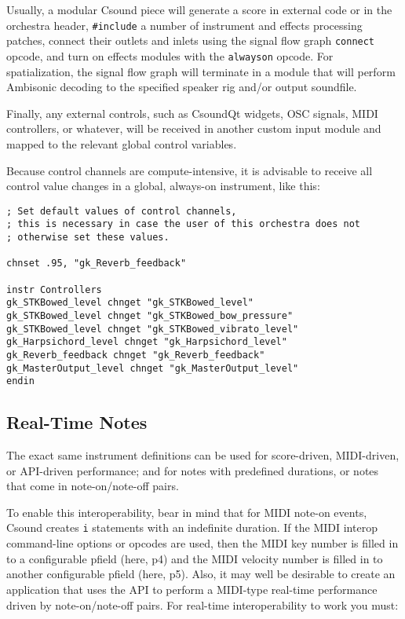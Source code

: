 \documentclass[12pt,letterpaper,onecolumn]{scrartcl}
\begin{document}
\begin{enumerate}
Usually, a modular Csound piece will generate a score in external code or in
the orchestra header, \texttt{\#include} a number of instrument and effects
processing patches, connect their outlets and inlets using the signal flow
graph \texttt{connect} opcode, and turn on effects modules with the
\texttt{alwayson} opcode. For spatialization, the signal flow graph will
terminate in a module that will perform Ambisonic decoding to the specified
speaker rig and/or output soundfile.

Finally, any external controls, such as CsoundQt widgets, OSC signals, MIDI
controllers, or whatever, will be received in another custom input module and
mapped to the relevant global control variables.

Because control channels are compute-intensive, it is advisable to receive all
control value changes in a global, always-on instrument, like this:

\begin{lstlisting}
; Set default values of control channels,
; this is necessary in case the user of this orchestra does not
; otherwise set these values.

chnset .95, "gk_Reverb_feedback"

instr Controllers
gk_STKBowed_level chnget "gk_STKBowed_level"
gk_STKBowed_level chnget "gk_STKBowed_bow_pressure"
gk_STKBowed_level chnget "gk_STKBowed_vibrato_level"
gk_Harpsichord_level chnget "gk_Harpsichord_level"
gk_Reverb_feedback chnget "gk_Reverb_feedback"
gk_MasterOutput_level chnget "gk_MasterOutput_level"
endin
\end{lstlisting}

\subsection{Real-Time Notes}

The exact same instrument definitions can be used for score-driven,
MIDI-driven, or API-driven performance; and for notes with predefined
durations, or notes that come in note-on/note-off pairs.

To enable this interoperability, bear in mind that for MIDI note-on events,
Csound creates \texttt{i} statements with an indefinite duration. If the MIDI
interop command-line options or opcodes are used, then the MIDI key number is
filled in to a configurable pfield (here, p4) and the MIDI velocity number is
filled in to another configurable pfield (here, p5). Also, it may well be
desirable to create an application that uses the API to perform a MIDI-type
real-time performance driven by note-on/note-off pairs. For real-time
interoperability to work you must:


\end{enumerate}
\end{document}
